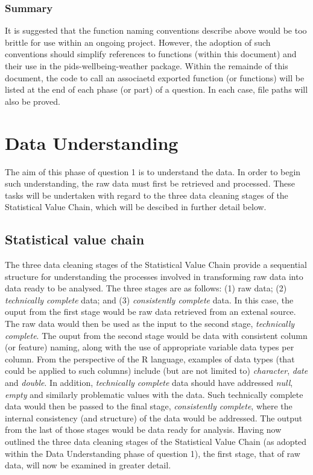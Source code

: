 \documentclass[12pt, oneside, openany]{book}
\begin{document}
\subsubsection*{Summary}
It is suggested that the function naming conventions describe above would be too brittle for use within an ongoing project. However, the adoption of such conventions should simplify references to functions (within this document) and their use in the pids-wellbeing-weather package. Within the remainde of this document, the code to call an associaetd exported function (or functions) will be listed at the end of each phase (or part) of a question. In each case, file paths will also be proved.

\section*{Data Understanding}
The aim of this phase of question 1 is to understand the data. In order to begin such understanding, the raw data must first be retrieved and processed. These tasks will be undertaken with regard to the three data cleaning stages of the Statistical Value Chain, which will be descibed in further detail below.
  
\subsection*{Statistical value chain}
The three data cleaning stages of the Statistical Value Chain provide a sequential structure for understanding the processes involved in transforming raw data into data ready to be analysed. The three stages are as follows: (1) raw data; (2) \emph{technically complete} data; and (3) \emph{consistently complete} data. In this case, the ouput from the first stage would be raw data retrieved from an extenal source. The raw data would then be used as the input to the second stage, \emph{technically complete}. The ouput from the second stage would be data with consistent column (or feature) naming, along with the use of appropriate variable data types per column. From the perspective of the R language\cite{rTypes}, examples of data types (that could be applied to such columns) include (but are not limited to) \emph{character}, \emph{date} and \emph{double}. In addition, \emph{technically complete} data should have addressed \emph{null}, \emph{empty} and similarly problematic values with the data. Such technically complete data would then be passed to the final stage, \emph{consistently complete}, where the internal consistency (and structure) of the data would be addressed. The output from the last of those stages would be data ready for analysis. Having now outlined the three data cleaning stages of the Statistical Value Chain (as adopted within the Data Understanding phase of question 1), the first stage, that of raw data, will now be examined in greater detail.
\end{document}
